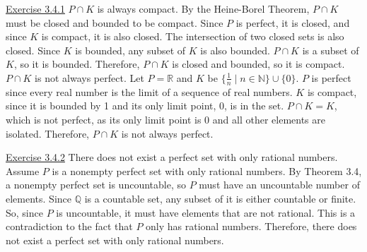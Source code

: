 \documentclass{exam}
\begin{document}
\underline{Exercise 3.4.1}
\newline
\newline
$P\cap K$ is always compact. By the Heine-Borel Theorem, $P\cap K$ must be closed and bounded to be compact. Since $P$ is perfect, it is closed, and since $K$ is compact, it is also closed. The intersection of two closed sets is also closed. Since $K$ is bounded, any subset of $K$ is also bounded. $P\cap K$ is a subset of $K$, so it is bounded. Therefore, $P\cap K$ is closed and bounded, so it is compact.
\newline
\newline
$P\cap K$ is not always perfect. Let $P=\mathbb{R}$ and $K$ be $\{\frac{1}{n}\mid n\in \mathbb{N}\}\cup\{0\}$. $P$ is perfect since every real number is the limit of a sequence of real numbers. $K$ is compact, since it is bounded by 1 and its only limit point, 0, is in the set. $P\cap K=K$, which is not perfect, as its only limit point is 0 and all other elements are isolated. Therefore, $P\cap K$ is not always perfect.
\newline

\underline{Exercise 3.4.2}
\newline
\newline
There does not exist a perfect set with only rational numbers. Assume $P$ is a nonempty perfect set with only rational numbers. By Theorem 3.4, a nonempty perfect set is uncountable, so $P$ must have an uncountable number of elements. Since $\mathbb{Q}$ is a countable set, any subset of it is either countable or finite. So, since $P$ is uncountable, it must have elements that are not rational. This is a contradiction to the fact that $P$ only has rational numbers. Therefore, there does not exist a perfect set with only rational numbers.
\newline
\end{document}
